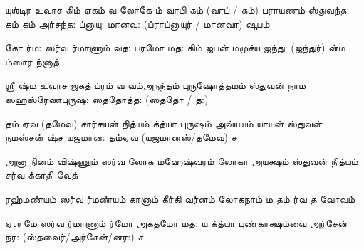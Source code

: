 \documentclass[10pt]{article}
\begin{document}
{\newpage
\slokad
{யுஶ்டிர உவாச}
{கிம் \hdspc ஏகம் வ லோகே} {ம் வாபி \hdspc {}கம் (வாப் / கம்) பராயணம்}
{ஸ்துவந்த: கம் கம் \hdspc அர்சந்த:} {ப்னுயு: \hdspc மானவ: (ப்ராப்னுயுர் / மானவா) ஷுபம்}

\slokas
{கோ ர்ம: ஸர்வ ர்மாணாம்}{ வத: பரமோ மத:}
{கிம் ஜபன் \hdspc மமுச்ய ஜந்து: (ஜந்துர்)}{ ன்ம ம்ஸார ந்னாத்}

\slokad 
{ஶ்ரீ ஷ்ம உவாச}
{ஜகத் ப்ரம் வ வம்}{அநந்தம் புருஷோத்தமம்}
{ஸ்துவன் \hdspc நாம ஸஹஸ்ரேண}{புருஷ: ஸததோத்த: (ஸததோ / த:)}

\slokas
{தம் \hdspc ஏவ (தமேவ) சார்சயன் \hdspc நித்யம்} {க்த்யா புருஷம் \hdspc அவ்யயம்}
{யாயன் ஸ்துவன் நமஸ்சன் \hdspc ஷ்ச} {யஜமான: தம்\hdspc ஏவ (யஜமானஸ்/தமேவ) ச}

\slokas
{அனா நினம் விஷ்ணும்} {ஸர்வ லோக மஹேஷ்வரம்}
{லோகா \hdspc அயக்ஷம் ஸ்துவன் \hdspc நித்யம்} {சர்வ க்காதி வேத்}

\slokas
{ரஹ்மண்யம் ஸர்வ ர்மண்யம்} {கானாம் கீர்தி வர்னம்}
{லோகநாம் ம \hdspc {}தம்} {ர்வ த வோவம்}

\slokas
{ஏஶ மே ஸர்வ ர்மாணாம்}{ ர்மோ \hdspc அகதமோ மத:}
{ய \hdspc {}க்த்யா புண்காக்ஷம்}{வை அர்சேன் நர: (ஸ்தவைர்/அர்சேன்/னர:) ச}


} 
\end{document}
